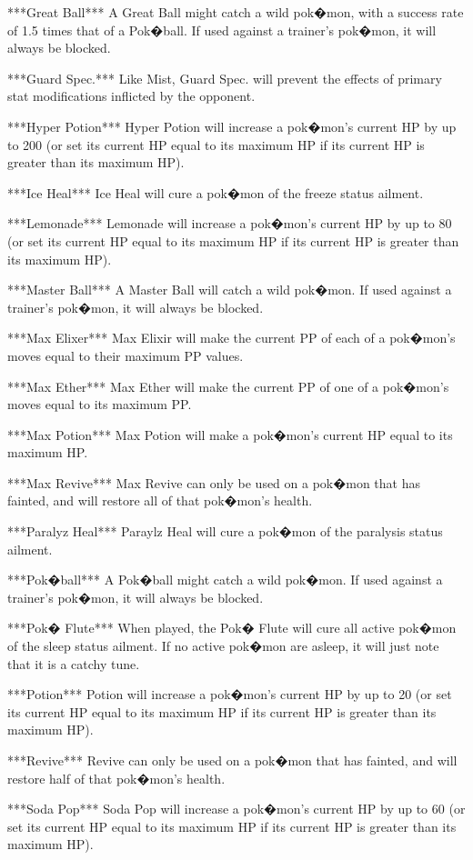 \documentclass[reprint, aps, prl, paper=A4]{revtex4-1}
\begin{document}
***Great Ball***
A Great Ball might catch a wild pok�mon, with a success rate of 1.5 times that of a Pok�ball.
If used against a trainer's pok�mon, it will always be blocked.

***Guard Spec.***
Like Mist, Guard Spec. will prevent the effects of primary stat modifications inflicted by the
opponent.

***Hyper Potion***
Hyper Potion will increase a pok�mon's current HP by up to 200 (or set its current HP equal to
its maximum HP if its current HP is greater than its maximum HP).

***Ice Heal***
Ice Heal will cure a pok�mon of the freeze status ailment.

***Lemonade***
Lemonade will increase a pok�mon's current HP by up to 80 (or set its current HP equal to its
maximum HP if its current HP is greater than its maximum HP).

***Master Ball***
A Master Ball will catch a wild pok�mon. If used against a trainer's pok�mon, it will always be
blocked.

***Max Elixer***
Max Elixir will make the current PP of each of a pok�mon's moves equal to their maximum PP
values.

***Max Ether***
Max Ether will make the current PP of one of a pok�mon's moves equal to its maximum PP.

***Max Potion***
Max Potion will make a pok�mon's current HP equal to its maximum HP.

***Max Revive***
Max Revive can only be used on a pok�mon that has fainted, and will restore all of that
pok�mon's health.

***Paralyz Heal***
Paraylz Heal will cure a pok�mon of the paralysis status ailment.

***Pok�ball***
A Pok�ball might catch a wild pok�mon. If used against a trainer's pok�mon, it will always be
blocked.

***Pok� Flute***
When played, the Pok� Flute will cure all active pok�mon of the sleep status ailment. If no
active pok�mon are asleep, it will just note that it is a catchy tune.

***Potion***
Potion will increase a pok�mon's current HP by up to 20 (or set its current HP equal to its
maximum HP if its current HP is greater than its maximum HP).

***Revive***
Revive can only be used on a pok�mon that has fainted, and will restore half of that pok�mon's
health.

***Soda Pop***
Soda Pop will increase a pok�mon's current HP by up to 60 (or set its current HP equal to its
maximum HP if its current HP is greater than its maximum HP).
\end{document}
